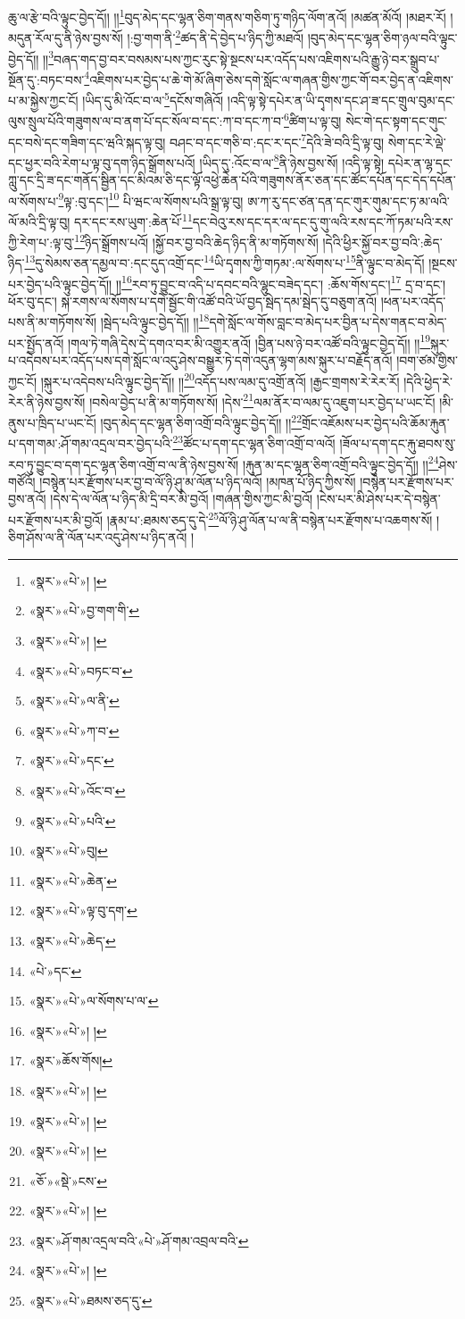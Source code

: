 ཆུ་ལ་རྩེ་བའི་ལྟུང་བྱེད་དོ།། །།\footnote{«སྣར་»«པེ་»། །}བུད་མེད་དང་ལྷན་ཅིག་གནས་གཅིག་ཏུ་གཉིད་ལོག་ནའོ། །མཚན་མོའོ། །མཐར་རོ། །མདུན་རོལ་དུ་ནི་ཉེས་བྱས་སོ། །:བྱ་གག་ནི་\footnote{«སྣར་»«པེ་»བྱ་གག་གི་}ཚད་ནི་དེ་བྱེད་པ་ཉིད་ཀྱི་མཐའོ། །བུད་མེད་དང་ལྷན་ཅིག་ཉལ་བའི་ལྟུང་བྱེད་དོ།། །།\footnote{«སྣར་»«པེ་»། །}བཞད་གད་བྱ་བར་བསམས་པས་ཀྱང་རུང་སྟེ་སྔངས་པར་འདོད་པས་འཇིགས་པའི་རྒྱུ་ཉེ་བར་སྒྲུབ་པ་སྔོན་དུ་:བཏང་བས་\footnote{«སྣར་»«པེ་»བཏང་བ་}འཇིགས་པར་བྱེད་པ་ཆེ་གེ་མོ་ཞིག་ཅེས་དགེ་སློང་ལ་གཞན་གྱིས་ཀྱང་གོ་བར་བྱེད་ན་འཇིགས་པ་མ་སྐྱེས་ཀྱང་ངོ། །ཡིད་དུ་མི་འོང་བ་ལ་\footnote{«སྣར་»«པེ་»ལ་ནི་}དངོས་གཞིའོ། །འདི་ལྟ་སྟེ་དཔེར་ན་ཡི་དྭགས་དང་ཤ་ཟ་དང་གྲུལ་བུམ་དང་ལུས་སྲུལ་པོའི་གཟུགས་ལ་བ་ནག་པོ་དང་སོལ་བ་དང་:ཀ་བ་དང་ཀ་བ་\footnote{«སྣར་»«པེ་»ཀ་བ་}ཚིག་པ་ལྟ་བུ། སེང་གེ་དང་སྟག་དང་གུང་དང་བསེ་དང་གཟིག་དང་ཝའི་སྐད་ལྟ་བུ། བཤང་བ་དང་གཅི་བ་:དང་ར་དང་\footnote{«སྣར་»«པེ་»དང་}དེའི་ཟེ་བའི་དྲི་ལྟ་བུ། སེག་དང་རེ་ལྡེ་དང་ཕྱར་བའི་རེག་པ་ལྟ་བུ་དག་ཉིད་སྒྲོགས་པའོ། །ཡིད་དུ་:འོང་བ་ལ་\footnote{«སྣར་»«པེ་»འོང་བ་}ནི་ཉེས་བྱས་སོ། །འདི་ལྟ་སྟེ། དཔེར་ན་ལྷ་དང་ཀླུ་དང་དྲི་ཟ་དང་གནོད་སྦྱིན་དང་མིའམ་ཅི་དང་ལྟོ་འཕྱེ་ཆེན་པོའི་གཟུགས་ནོར་ཅན་དང་ཚོང་དཔོན་དང་དེད་དཔོན་ལ་སོགས་པ་\footnote{«སྣར་»«པེ་»པའི་}ལྟ་:བུ་དང་།\footnote{«སྣར་»«པེ་»བུ།} པི་ཝང་ལ་སོགས་པའི་སྒྲ་ལྟ་བུ། ཨ་ཀ་རུ་དང་ཙན་དན་དང་གུར་གུམ་དང་ཏ་མ་ལའི་ལོ་མའི་དྲི་ལྟ་བུ། དར་དང་རས་ཡུག་:ཆེན་པོ་\footnote{«སྣར་»«པེ་»ཆེན་}དང་བེའུ་རས་དང་དར་ལ་དང་དུ་གུ་ལའི་རས་དང་ཀོ་ཏམ་པའི་རས་ཀྱི་རེག་པ་:ལྟ་བུ་\footnote{«སྣར་»«པེ་»ལྟ་བུ་དག་}ཉིད་སྒྲོགས་པའོ། །སྐྱོ་བར་བྱ་བའི་ཆེད་ཉིད་ནི་མ་གཏོགས་སོ། །དེའི་ཕྱིར་སྐྱོ་བར་བྱ་བའི་:ཆེད་ཉིད་\footnote{«སྣར་»«པེ་»ཆེད་}དུ་སེམས་ཅན་དམྱལ་བ་:དང་དུད་འགྲོ་དང་\footnote{«པེ་»དང་}ཡི་དྭགས་ཀྱི་གཏམ་:ལ་སོགས་པ་\footnote{«སྣར་»«པེ་»ལ་སོགས་པ་ལ་}ནི་ལྟུང་བ་མེད་དོ། །སྔངས་པར་བྱེད་པའི་ལྟུང་བྱེད་དོ།། །།\footnote{«སྣར་»«པེ་»། །}རབ་ཏུ་བྱུང་བ་འདི་པ་དབང་བའི་ལྷུང་བཟེད་དང་། :ཆོས་གོས་དང་།\footnote{«སྣར་»ཆོས་གོས།} དྲ་བ་དང་། ཕོར་བུ་དང་། སྐ་རགས་ལ་སོགས་པ་དགེ་སྦྱོང་གི་འཚོ་བའི་ཡོ་བྱད་སྦེད་དམ་སྦེད་དུ་བཅུག་ནའོ། །ཕན་པར་འདོད་པས་ནི་མ་གཏོགས་སོ། །སྦེད་པའི་ལྟུང་བྱེད་དོ།། །།\footnote{«སྣར་»«པེ་»། །}དགེ་སློང་ལ་གོས་བླང་བ་མེད་པར་བྱིན་པ་དེས་གནང་བ་མེད་པར་སྤྱོད་ནའོ། །གལ་ཏེ་གཞི་དེས་དེ་དགའ་བར་མི་འགྱུར་ནའོ། །བྱིན་པས་ཉེ་བར་འཚོ་བའི་ལྟུང་བྱེད་དོ།། །།\footnote{«སྣར་»«པེ་»། །}སྐུར་པ་འདེབས་པར་འདོད་པས་དགེ་སློང་ལ་འདུ་ཤེས་བསྒྱུར་ཏེ་དགེ་འདུན་ལྷག་མས་སྐུར་པ་བརྗོད་ནའོ། །བག་ཙམ་གྱིས་ཀྱང་ངོ། །སྐུར་པ་འདེབས་པའི་ལྟུང་བྱེད་དོ།། །།\footnote{«སྣར་»«པེ་»། །}འདོད་པས་ལམ་དུ་འགྲོ་ནའོ། །རྒྱང་གྲགས་རེ་རེར་རོ། །དེའི་ཕྱེད་རེ་རེར་ནི་ཉེས་བྱས་སོ། །བསེལ་བྱེད་པ་ནི་མ་གཏོགས་སོ། །དེས་\footnote{«ཅོ་»«སྡེ་»ངས་}ལམ་ནོར་བ་ལམ་དུ་འཇུག་པར་བྱེད་པ་ཡང་ངོ། །མི་ནུས་པ་ཁྲིད་པ་ཡང་ངོ། །བུད་མེད་དང་ལྷན་ཅིག་འགྲོ་བའི་ལྟུང་བྱེད་དོ།། །།\footnote{«སྣར་»«པེ་»། །}གྲོང་འཇོམས་པར་བྱེད་པའི་ཆོམ་རྐུན་པ་དག་གམ་:ཤོ་གམ་འདྲལ་བར་བྱེད་པའི་\footnote{«སྣར་»ཤོ་གམ་འདྲལ་བའི་«པེ་»ཤོ་གམ་འབྲལ་བའི་}ཚོང་པ་དག་དང་ལྷན་ཅིག་འགྲོ་བ་ལའོ། །ཟོལ་པ་དག་དང་རྐུ་ཐབས་སུ་རབ་ཏུ་བྱུང་བ་དག་དང་ལྷན་ཅིག་འགྲོ་བ་ལ་ནི་ཉེས་བྱས་སོ། །རྐུན་མ་དང་ལྷན་ཅིག་འགྲོ་བའི་ལྟུང་བྱེད་དོ།། །།\footnote{«སྣར་»«པེ་»། །}ཤེས་གཙོའོ། །བསྙེན་པར་རྫོགས་པར་བྱ་བ་ལོ་ཉི་ཤུ་མ་ལོན་པ་ཉིད་ལའོ། །མཁན་པོ་ཉིད་ཀྱིས་སོ། །བསྙེན་པར་རྫོགས་པར་བྱས་ནའོ། །དེས་དེ་ལ་ལོན་པ་ཉིད་མི་དྲི་བར་མི་བྱའོ། །གཞན་གྱིས་ཀྱང་མི་བྱའོ། །ངེས་པར་མི་ཤེས་པར་དེ་བསྙེན་པར་རྫོགས་པར་མི་བྱའོ། །རྣམ་པ་:ཐམས་ཅད་དུ་དེ་\footnote{«སྣར་»«པེ་»ཐམས་ཅད་དུ་}ལོ་ཉི་ཤུ་ལོན་པ་ལ་ནི་བསྙེན་པར་རྫོགས་པ་འཆགས་སོ། །ཅིག་ཤོས་ལ་ནི་ལོན་པར་འདུ་ཤེས་པ་ཉིད་ནའོ། །
